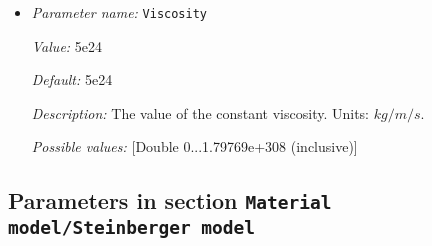 \begin{itemize}
{\it Value:} 0.0


{\it Default:} 0.0


{\it Description:} The temperature dependence of viscosity. Dimensionless exponent.


{\it Possible values:} [Double 0...1.79769e+308 (inclusive)]
\item {\it Parameter name:} {\tt Viscosity}


{\it Value:} 5e24


{\it Default:} 5e24


{\it Description:} The value of the constant viscosity. Units: $kg/m/s$.


{\it Possible values:} [Double 0...1.79769e+308 (inclusive)]
\end{itemize}

\subsection{Parameters in section \tt Material model/Steinberger model}
\label{parameters:Material_20model/Steinberger_20model}


